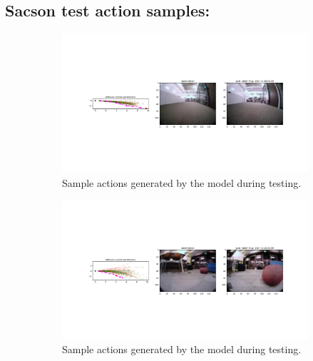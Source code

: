 \documentclass[12pt]{article}
\begin{document}
\subsection{Sacson test action samples:}
\begin{figure}[H]
    \centering
    \begin{subfigure}[b]{0.48\textwidth}
        \centering
        \includegraphics[width=\textwidth]{images/sacson_test_action_samples_1.png}
        \caption{Sample actions generated by the model during testing.}
        \label{fig:sacon_test_action_samples_1}
    \end{subfigure}
    \hfill
    \begin{subfigure}[b]{0.48\textwidth}
        \centering
        \includegraphics[width=\textwidth]{images/sacson_test_action_samples_2.png}
        \caption{Sample actions generated by the model during testing.}
        \label{fig:sacon_test_action_samples_2}
    \end{subfigure}
    \hfill
    \begin{subfigure}[b]{0.48\textwidth}
        \centering

\end{subfigure}
\end{figure}
\end{document}
